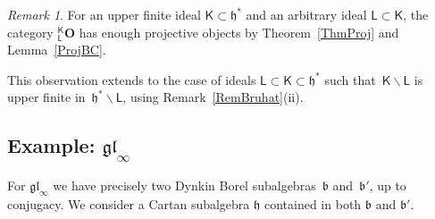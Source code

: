 \documentclass[11pt]{amsart}
\newcommand{\LLL}{\mathsf{L}}
\newcommand{\KKK}{\mathsf{K}}
\newcommand{\cF}{{\mathcal{F}}}
\newcommand{\tto}{\twoheadrightarrow}
\newcommand{\bO}{\mathbf{O}}
\newcommand{\Hom}{\mathrm{Hom}}
\newcommand{\Ext}{\mathrm{Ext}}
\newcommand{\fh}{\mathfrak{h}}
\newcommand{\fb}{\mathfrak{b}}
\numberwithin{equation}{section}
\theoremstyle{plain}
\theoremstyle{remark}
\newtheorem{rem}[subsubsection]{Remark}
\theoremstyle{remark}
\theoremstyle{construction}
\begin{document}



\begin{rem}
For an upper finite ideal $\KKK\subset\fh^\ast$ and an arbitrary ideal $\LLL\subset \KKK$, the category ${}^{\KKK}_{\LLL}\bO$ has enough projective objects by Theorem~\ref{ThmProj} and Lemma~\ref{ProjBC}.

This observation extends to the case of ideals $\LLL\subset \KKK\subset \fh^\ast$ such that~$\KKK\backslash\LLL$ is upper finite in~$\fh^\ast\backslash\LLL$, using Remark~\ref{RemBruhat}(ii).
\end{rem}


\subsection{Example: $\mathfrak{gl}_{\infty}$}
For $\mathfrak{gl}_{\infty}$ we have precisely two Dynkin Borel subalgebras~$\fb$ and~$\fb'$, up to conjugacy. We consider a Cartan subalgebra $\fh$ contained in both {$\mathfrak{b}$ and $\mathfrak{b}'$}.
\end{document}
